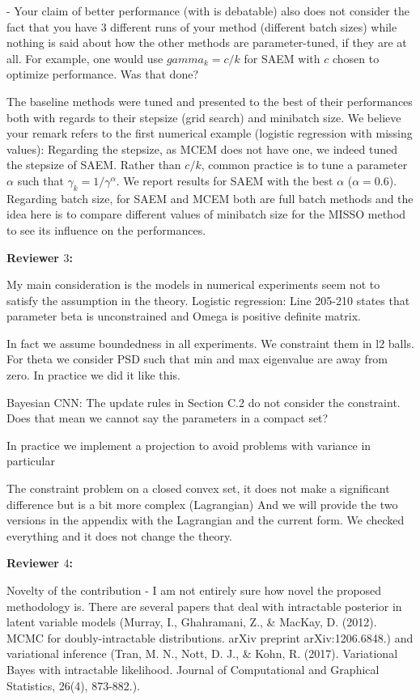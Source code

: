 \documentclass{article}
\begin{document}
- Your claim of better performance (with is debatable) also does not consider the fact that you have 3 different runs of your method (different batch sizes) while nothing is said about how the other methods are parameter-tuned, if they are at all. For example, one would use $gamma_k = c/k$ for SAEM with $c$ chosen to optimize performance. Was that done?

The baseline methods were tuned and presented to the best of their performances both with regards to their stepsize (grid search) and minibatch size.
We believe your remark refers to the first numerical example (logistic regression with missing values): Regarding the stepsize, as MCEM does not have one, we indeed tuned the stepsize of SAEM. Rather than $c/k$, common practice is to tune a parameter $\alpha$ such that $\gamma_k = 1/\gamma^{\alpha}$. We report results for SAEM with the best $\alpha$ ($\alpha = 0.6$). Regarding batch size, for SAEM and MCEM both are full batch methods and the idea here is to compare different values of minibatch size for the MISSO method to see its influence on the performances.




\textbf{Reviewer $3$:}

My main consideration is the models in numerical experiments seem not to satisfy the assumption in the theory.
Logistic regression: Line 205-210 states that parameter beta is unconstrained and Omega is positive definite matrix.

In fact we assume boundedness in all experiments. We constraint them in l2 balls.
For theta we consider PSD such that min and max eigenvalue are away from zero.
In practice we did it like this.

Bayesian CNN: The update rules in Section C.2 do not consider the constraint. Does that mean we cannot say the parameters in a compact set?

In practice we implement a projection to avoid problems with variance in particular

The constraint problem on a closed convex set, it does not make a significant difference but is a bit more complex (Lagrangian)
And we will provide the two versions in the appendix with the Lagrangian and the current form. 
We checked everything and it does not change the theory.

\textbf{Reviewer $4$:}

Novelty of the contribution
- I am not entirely sure how novel the proposed methodology is. There are several papers that deal with intractable posterior in latent variable models (Murray, I., Ghahramani, Z., \& MacKay, D. (2012). MCMC for doubly-intractable distributions. arXiv preprint arXiv:1206.6848.) and variational inference (Tran, M. N., Nott, D. J., \& Kohn, R. (2017). Variational Bayes with intractable likelihood. Journal of Computational and Graphical Statistics, 26(4), 873-882.). 
\end{document}
